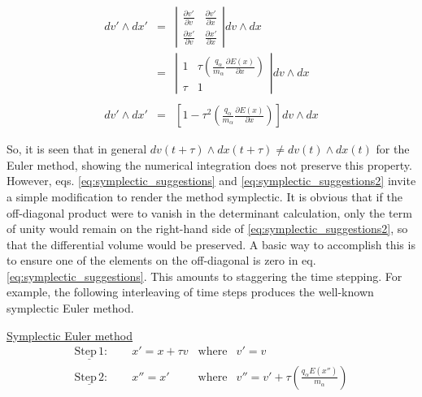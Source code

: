 \documentclass[11pt,titlepage]{report}
\begin{document}
\begin{eqnarray}
dv' \wedge dx' & = &  \left| \begin{array}{cc}
\frac{\partial v'}{\partial v} & \frac{\partial v'}{\partial x} \nonumber \\[0.7em]
\frac{\partial x'}{\partial v} & \frac{\partial x'}{\partial x} \end{array}\right| dv \wedge dx \\[0.7em]
& = & \left| \begin{array}{cc}
1 & \tau \left(\frac{q_{\alpha}}{m_{\alpha}}\frac{\partial E(x) }{\partial x}\right)  \\[0.5em]
\tau & 1 \end{array}\right| dv \wedge dx \label{eq:symplectic_suggestions}\\[0.7em]
&& \nonumber \\[0.5em]
dv' \wedge dx' & = & \left[1 - \tau^2\left(\frac{q_{\alpha}}{m_{\alpha}}\frac{\partial E(x) }{\partial x}\right)\right] dv \wedge dx \label{eq:symplectic_suggestions2} \end{eqnarray}

\noindent So, it is seen that in general $dv(t + \tau ) \wedge dx (t + \tau ) \neq dv(t) \wedge dx (t)$ for the Euler method, showing the numerical integration does not preserve this property. However, eqs. \eqref{eq:symplectic_suggestions} and \eqref{eq:symplectic_suggestions2} invite a simple modification to render the method symplectic. It is obvious that if the off-diagonal product were to vanish in the determinant calculation, only the term of unity would remain on the right-hand side of \eqref{eq:symplectic_suggestions2}, so that the differential volume would be preserved. A basic way to accomplish this is to ensure one of the elements on the off-diagonal is zero in eq. \eqref{eq:symplectic_suggestions}. This amounts to staggering the time stepping. For example, the following interleaving of time steps produces the well-known symplectic Euler method.

\vspace{2em}
\underline{Symplectic Euler method}\\[.3em]
\begin{eqnarray}
\mathrm{\underline{Step\, 1}: }\qquad  x' = x + \tau v & \mathrm{where} &  v' = v \label{eq:Symplectic_Euler_x}\\
\mathrm{\underline{Step\, 2}: } \qquad x'' = x'\phantom{+ \tau v }  & \mathrm{where} & v'' = v' + \tau\left(\frac{q_{\alpha}E(x'')}{m_{\alpha}}\right) \label{eq:Symplectic_Euler_v}
\end{eqnarray}
\end{document}
